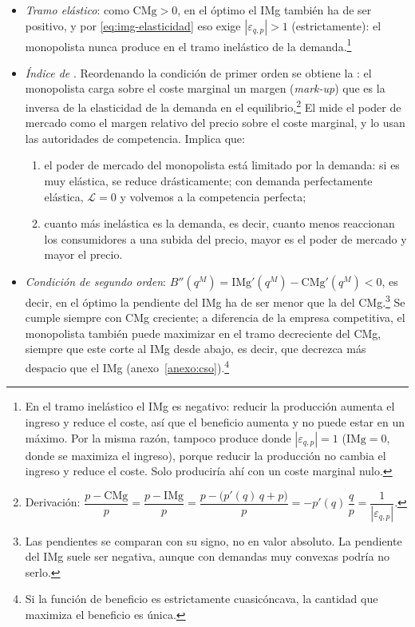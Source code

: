 \documentclass[11pt]{article}
\begin{document}
\begin{itemize}
\begin{itemize}
  \end{itemize}
\item \emph{Tramo elástico}: como $\mathrm{CMg}>0$, en el óptimo el IMg también ha de ser positivo, y por \eqref{eq:img-elasticidad} eso exige $|\varepsilon_{q,p}|>1$ (estrictamente): el monopolista nunca produce en el tramo inelástico de la demanda.\footnote{En el tramo inelástico el IMg es negativo: reducir la producción aumenta el ingreso y reduce el coste, así que el beneficio aumenta y no puede estar en un máximo. Por la misma razón, tampoco produce donde $|\varepsilon_{q,p}|=1$ ($\mathrm{IMg}=0$, donde se maximiza el ingreso), porque reducir la producción no cambia el ingreso y reduce el coste. Solo produciría ahí con un coste marginal nulo.}
\item \emph{Índice de }. Reordenando la condición de primer orden se obtiene la : el monopolista carga sobre el coste marginal un margen (\emph{mark-up}) que es la inversa de la elasticidad de la demanda en el equilibrio,\footnote{Derivación: $\dfrac{p-\mathrm{CMg}}{p}=\dfrac{p-\mathrm{IMg}}{p}=\dfrac{p-\big(p'(q)\,q+p\big)}{p}=-p'(q)\,\dfrac{q}{p}=\dfrac{1}{|\varepsilon_{q,p}|}$.}
  El  mide el poder de mercado como el margen relativo del precio sobre el coste marginal\nocite{Lerner1934Concept}, y lo usan las autoridades de competencia. Implica que:
  \begin{enumerate}[label=\roman*)]
  \item el poder de mercado del monopolista está limitado por la demanda: si es muy elástica, se reduce drásticamente; con demanda perfectamente elástica, $\mathcal{L}=0$ y volvemos a la competencia perfecta;
  \item cuanto más inelástica es la demanda, es decir, cuanto menos reaccionan los consumidores a una subida del precio, mayor es el poder de mercado y mayor el precio.
  \end{enumerate}
\item \emph{Condición de segundo orden}: $B''(q^M)=\mathrm{IMg}'(q^M)-\mathrm{CMg}'(q^M)<0$, es decir, en el óptimo la pendiente del IMg ha de ser menor que la del CMg.\footnote{Las pendientes se comparan con su signo, no en valor absoluto. La pendiente del IMg suele ser negativa, aunque con demandas muy convexas podría no serlo.} Se cumple siempre con CMg creciente; a diferencia de la empresa competitiva, el monopolista también puede maximizar en el tramo decreciente del CMg, siempre que este corte al IMg desde abajo, es decir, que decrezca más despacio que el IMg (anexo~\ref{anexo:cso}).\footnote{Si la función de beneficio es estrictamente cuasicóncava, la cantidad que maximiza el beneficio es única.}

\end{itemize}
\end{document}
